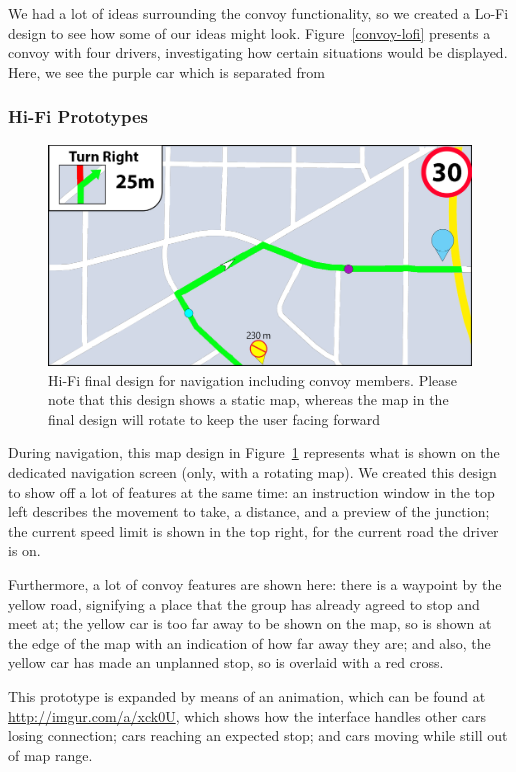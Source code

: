 \documentclass{article}
\begin{document}
We had a lot of ideas surrounding the convoy functionality, so we created a Lo-Fi design to see how some of our ideas might look. Figure~\ref{convoy-lofi} presents a convoy with four drivers, investigating how certain situations would be displayed. Here, we see the purple car which is separated from 

\subsubsection{Hi-Fi Prototypes}

\begin{figure}[H]
  \centering
  \includegraphics[scale=0.3]{convoy-map}
  \caption{Hi-Fi final design for navigation including convoy members. Please note that this design shows a static map, whereas the map in the final design will rotate to keep the user facing forward}\label{convoy-map}
\end{figure}
During navigation, this map design in Figure~\ref{convoy-map} represents what is shown on the dedicated navigation screen (only, with a rotating map). We created this design to show off a lot of features at the same time: an instruction window in the top left describes the movement to take, a distance, and a preview of the junction; the current speed limit is shown in the top right, for the current road the driver is on.

Furthermore, a lot of convoy features are shown here: there is a waypoint by the yellow road, signifying a place that the group has already agreed to stop and meet at; the yellow car is too far away to be shown on the map, so is shown at the edge of the map with an indication of how far away they are; and also, the yellow car has made an unplanned stop, so is overlaid with a red cross.

This prototype is expanded by means of an animation, which can be found at \url{http://imgur.com/a/xck0U}, which shows how the interface handles other cars losing connection; cars reaching an expected stop; and cars moving while still out of map range.
\end{document}
